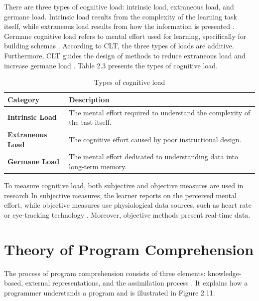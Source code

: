 There are three types of cognitive load: intrinsic load, extraneous load, and germane load. Intrinsic load results from the complexity of the learning task itself, while extraneous load results from how the information is presented \cite{schnotz2007reconsideration}. Germane cognitive load refers to mental effort used for learning, specifically for building schemas \cite{chen2009cognitive}. According to CLT, the three types of loads are additive. Furthermore, CLT guides the design of methods to reduce extraneous load and increase germane load  \cite{chen2009cognitive}. Table 2.3 presents the types of cognitive load.





\begin{table}[ht]
\centering
\small %
\caption{Types of cognitive load}
\begin{tabular}{p{} | p{}}
\hline
\textbf{Category} & \textbf{Description} \\
\hline
\textbf{Intrinsic Load} & The mental effort required to understand the complexity of the tast itself. \\
\hline
\textbf{Extraneous Load} & The cognitive effort caused by poor instructional design. \\
\hline
\textbf{Germane Load} & The mental effort dedicated to understanding data into long-term memory. \\
\hline
\end{tabular}
\label{tab:cognitive_load}
\end{table}


To measure cognitive load, both subjective and objective measures are used in research
In subjective measures, the  learner reports on the perceived mental effort, while objective measures use physiological data sources, such as heart rate or eye-tracking technology \cite{duran2022cognitive}. Moreover, objective methods present real-time data.


\section{Theory of Program Comprehension}

The process of program comprehension consists of three elements: knowledge-based, external representations, and the assimilation process \cite{kadar2021program}. It explains how a programmer understands a program and is illustrated in Figure 2.11.



